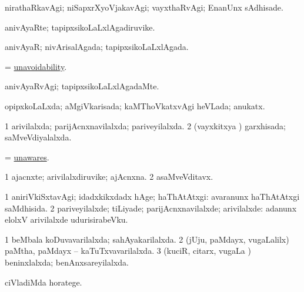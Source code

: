 \bentry
{} 
\gl{\kirxvi}
\expl{}
\bmng
nirathaRkavAgi; niSapxrXyoVjakavAgi; vayxthaRvAgi; EnanUnx sAdhisade. 
\emng
\eentry

\bentry
{} 
\gl{\nA}
\expl{}
\bmng
anivAyaRte; tapipxsikoLaLxlAgadiruvike. 
\emng
\eentry

\bentry
{} 
\gl{\gu}
\expl{}
\bmng
anivAyaR; nivArisalAgada; tapipxsikoLaLxlAgada. 
\emng
\eentry

\bentry
{} 
\gl{\nA}
\expl{}
\bmng
= \hyperlink{unavoidability}{unavoidability}. 
\emng
\eentry

\bentry
{} 
\gl{\kirxvi}
\expl{}
\bmng
anivAyaRvAgi; tapipxsikoLaLxlAgadaMte. 
\emng
\eentry

\bentry
{} 
\gl{\gu}
\expl{}
\bmng
opipxkoLaLxda; aMgiVkarisada; kaMThoVkatxvAgi heVLada; anukatx. 
\emng
\eentry

\bentry
{} 
\gl{\gu}
\expl{}
\bmng
\bnum
\num{1} arivilalxda; parijAcnxnavilalxda; pariveyilalxda. 
\num{2} (vayxkitxya \vi) garxhisada; saMveVdiyalalxda. 
\enum
\emng
\eentry

\bentry
{} 
\gl{\kirxvi}
\expl{}
\bmng
= \hyperlink{unawares}{unawares}. 
\emng
\eentry

\bentry
{} 
\gl{\nA}
\expl{}
\bmng
\bnum
\num{1} ajacnxte; arivilalxdiruvike; ajAcnxna. 
\num{2} asaMveVditavx. 
\enum
\emng
\eentry

\bentry
{} 
\gl{\kirxvi}
\expl{}
\bmng
\bnum
\num{1} aniriVkiSxtavAgi; idadxkikxdadx hAge; haThAtAtxgi:  avaranunx haThAtAtxgi saMdhisida. 
\num{2} pariveyilalxde; tiLiyade; parijAcnxnavilalxde; arivilalxde:  adanunx elolxV arivilalxde udurisirabeVku. 
\enum
\emng
\eentry

\bentry
{} 
\gl{\gu}
\expl{}
\bmng
\bnum
\num{1} beMbala koDuvavarilalxda; sahAyakarilalxda. 
\num{2} (jUju, paMdayx, \mo vugaLalilx) paMtha, paMdayx -- kaTuTxvavarilalxda. 
\num{3} (kuciR, citarx, \mo vugaLa \vi) beninxlalxda; benAnxsareyilalxda. 
\enum
\emng
\eentry

\bentry
{} 
\gl{\sakirx}
\expl{}
\bmng
ciVladiMda horatege. 
\emng
\eentry

